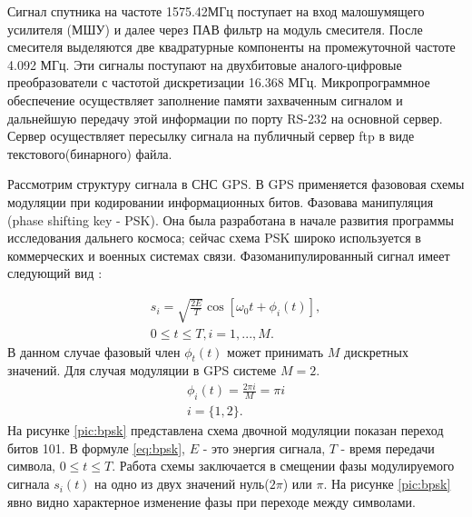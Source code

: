 \documentclass[a4paper,12pt]{article}
\numberwithin{table}{section}
\begin{document}
Сигнал спутника на частоте 1575.42МГц поступает на вход малошумящего усилителя (МШУ) и далее через ПАВ фильтр на модуль смесителя.
После смесителя выделяются две квадратурные компоненты на промежуточной частоте 4.092 МГц.
Эти сигналы поступают на двухбитовые аналого-цифровые преобразователи с частотой дискретизации 16.368 МГц.
Микропрограммное обеспечение осуществляет заполнение памяти захваченным сигналом и дальнейшую передачу этой информации
по порту RS-232 на основной сервер. Сервер осуществляет пересылку сигнала на публичный сервер ftp в виде текстового(бинарного) файла.

Рассмотрим структуру сигнала в СНС GPS. В GPS применяется фазововая схемы модуляции при кодировании информационных битов.
Фазовава манипуляция (phase shifting key - PSK).  Она была разработана  в начале развития программы исследования дальнего космоса;
сейчас схема PSK широко используется в коммерческих и военных системах связи. Фазоманипулированный сигнал имеет следующий вид \cite{sklyar}:

\begin{eqnarray}
s_i=\sqrt{\frac{2E}{T}}\cos{[{{\omega}_0}t + \phi_i(t)]}, \nonumber \\
	0\leq{t}\leq{T}, i = 1, ..., M.
\label{eq:bpsk}
\end{eqnarray}
В данном случае фазовый член ${\phi_t(t)}$ может принимать ${M}$ дискретных значений. Для случая модуляции в GPS системе ${M=2}$.
\begin{eqnarray}
	\phi_i(t)=\frac{2\pi{i}}{M}=\pi{i} \nonumber \\
	i = \{1,2\}.
\label{eq:bpsk_phi}
\end{eqnarray}
На рисунке \ref{pic:bpsk} представлена схема двочной модуляции показан переход битов 101. В формуле \ref{eq:bpsk}, ${E}$ - это энергия
сигнала, ${T}$ - время передачи символа, ${0\leq{t}\leq{T}}$. Работа схемы заключается в смещении фазы модулируемого сигнала
${s_i(t)}$ на одно из двух значений нуль(${2\pi}$) или ${\pi}$. На рисунке \ref{pic:bpsk} явно видно характерное изменение фазы при 
переходе между символами.
\end{document}
